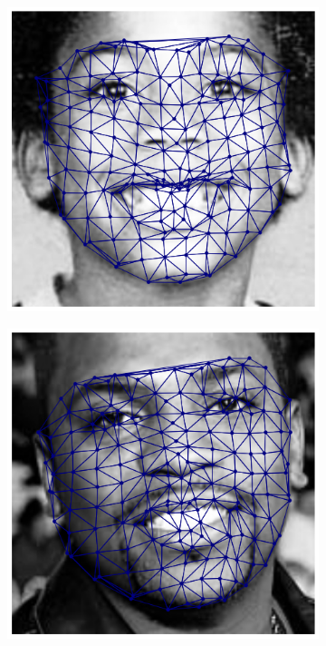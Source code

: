\begin{figure}[!h]
\begin{subfigure}[b]{0.115\textwidth}
    \end{subfigure}
    \begin{subfigure}[b]{0.115\textwidth}
            \includegraphics[height=1\textwidth]{supports/Fittings/fitting_face_0008}
    \end{subfigure}
    \begin{subfigure}[b]{0.115\textwidth}
            \includegraphics[height=1\textwidth]{supports/Fittings/fitting_face_0009}

\end{subfigure}
\end{figure}

